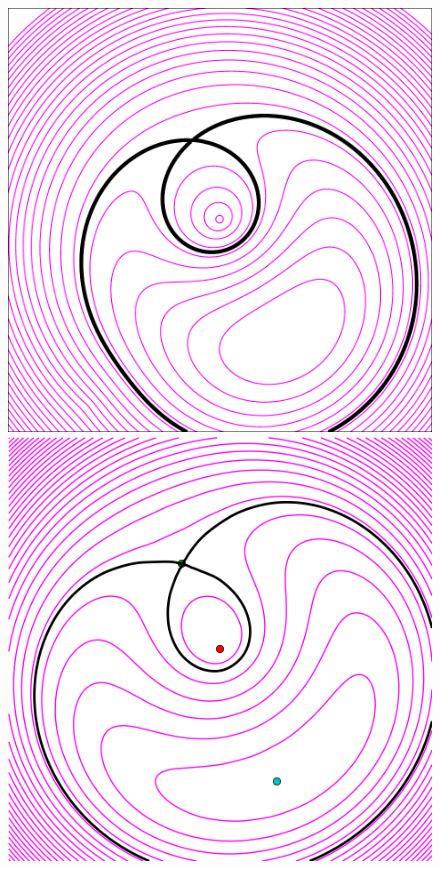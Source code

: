 \documentclass[usenatbib]{mn2e}
\newlength{\myplotswidth}
\begin{document}
\begin{figure}
  \includegraphics[width=\myplotswidth]{fig/ASW0000vqg_006937_arriv}
  \includegraphics[width=\myplotswidth]{fig/006937_spaghetti} \\

\end{figure}
\end{document}

